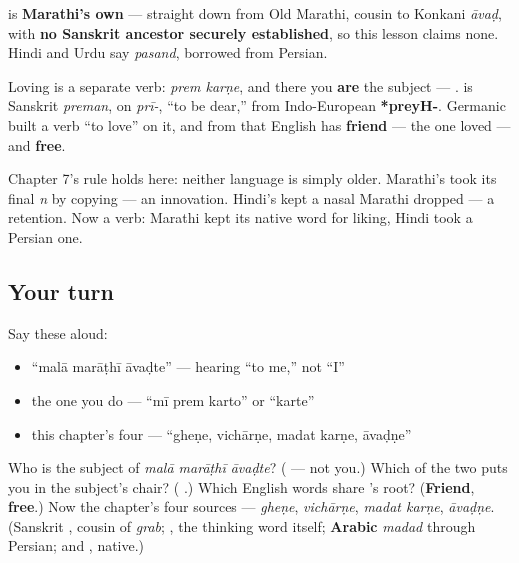 \begin{cousinweb}
\textbf{} is \textbf{Marathi's own} — straight down from Old Marathi, cousin to Konkani \emph{āvaḍ}, with \textbf{no Sanskrit ancestor securely established}, so this lesson claims none. Hindi and Urdu say \textbf{} \emph{pasand}, borrowed from Persian.

Loving is a separate verb: \textbf{ } \emph{prem karṇe}, and there you \textbf{are} the subject — \textbf{  }. \textbf{} is Sanskrit \emph{preman}, on \textbf{} \emph{prī-}, \textquotedblleft{}to be dear,\textquotedblright{} from Indo-European \textbf{*preyH-}. Germanic built a verb \textquotedblleft{}to love\textquotedblright{} on it, and from that English has \textbf{friend} — the one loved — and \textbf{free}.
\end{cousinweb}

\begin{culture}
Chapter 7's rule holds here: neither language is simply older. Marathi's \textbf{} took its final \emph{n} by copying \textbf{} — an innovation. Hindi's \textbf{} kept a nasal Marathi dropped — a retention. Now a verb: Marathi kept its native word for liking, Hindi took a Persian one.
\end{culture}

\subsection*{Your turn}
Say these aloud:

\begin{itemize}
\raggedright
  \item \textquotedblleft{}malā marāṭhī āvaḍte\textquotedblright{} — hearing \textquotedblleft{}to me,\textquotedblright{} not \textquotedblleft{}I\textquotedblright{}
  \item the one you do — \textquotedblleft{}mī prem karto\textquotedblright{} or \textquotedblleft{}karte\textquotedblright{}
  \item this chapter's four — \textquotedblleft{}gheṇe, vichārṇe, madat karṇe, āvaḍṇe\textquotedblright{}
\end{itemize}

\begin{tcolorbox}[breakable,colback=teal!4,colframe=teal!35!black,title={Before you move on}]
Who is the subject of \emph{malā marāṭhī āvaḍte}? (\textbf{} — not you.) Which of the two puts you in the subject's chair? (\textbf{ }.) Which English words share \textbf{}'s root? (\textbf{Friend}, \textbf{free}.) Now the chapter's four sources — \emph{gheṇe}, \emph{vichārṇe}, \emph{madat karṇe}, \emph{āvaḍṇe}. (Sanskrit \textbf{}, cousin of \emph{grab}; \textbf{}, the thinking word itself; \textbf{Arabic} \emph{madad} through Persian; and \textbf{}, native.)
\end{tcolorbox}
